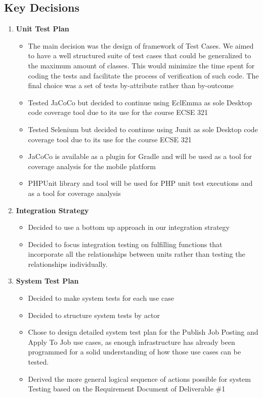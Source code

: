 \documentclass[12pt]{article}
\begin{document}
 \subsection{Key Decisions}
%
 \begin{enumerate}
    \item \textbf{Unit Test Plan}
    \begin{itemize}
        \item The main decision was the design of framework of Test Cases. We aimed to have a well structured suite of test cases that could be generalized to the maximum amount of classes. This would minimize the time spent for coding the tests and facilitate the process of verification of such code. The final choice was a set of tests by-attribute rather than by-outcome
        \item Tested JaCoCo but decided to continue using EclEmma as sole Desktop code coverage tool due to its use for the course ECSE 321
        \item Tested Selenium but decided to continue using Junit as sole Desktop code coverage tool due to its use for the course ECSE 321
        \item JaCoCo is available as a plugin for Gradle and will be used as a tool for coverage analysis for the mobile platform
        \item PHPUnit library and tool will be used for PHP unit test executions and as a tool for coverage analysis
     \end{itemize}
     \item \textbf{Integration Strategy}
         \begin{itemize}
             \item Decided to use a bottom up approach in our integration strategy
             \item Decided to focus integration testing on fulfilling functions that incorporate all the relationships between units rather than testing the relationships individually.
         \end{itemize}
     \item \textbf{System Test Plan}
     \begin{itemize}
        \item Decided to make system tests for each use case
        \item Decided to structure system tests by actor
        \item Chose to design detailed system test plan for the Publish Job Posting and Apply To Job
            use cases, as enough infrastructure has already been programmed for a solid
            understanding of how those use cases can be tested.
        \item Derived the more general logical sequence of actions possible for system Testing based on the Requirement Document of Deliverable \#1
     \end{itemize}
 \end{enumerate}
%
\end{document}
